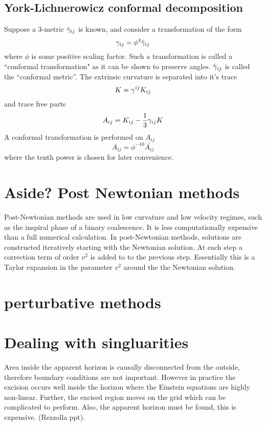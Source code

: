 \subsection{York-Lichnerowicz conformal decomposition}
Suppose a 3-metric $\bar{{\gamma}}_{ij}$ is known, and consider a transformation of the form
\[ {\gamma}_{ij}= \phi^4 \bar{{\gamma}}_{ij} \]
where $\phi$ is some positive scaling factor. Such a transformation is called a ``conformal transformation" as it can be shown to preserve angles. $\bar{{\gamma}}_{ij}$ is called the ``conformal metric''. The extrinsic curvature is separated into it's trace
\[ K={\gamma}^{ij} K_{ij} \]
and trace free parts
\[ A_{ij}=K_{ij} - \frac{1}{3} {\gamma}_{ij}K \]
A conformal transformation is performed on $A_{ij}$
\[ A_{ij}=\phi^{-10}\bar{A_{ij}}\]
where the tenth power is chosen for later convenience. 

\section{Aside? Post Newtonian methods}
Post-Newtonian methods are used in low curvature and low velocity regimes, such as the inspiral phase of a binary coalescence. It is less computationally expensive than a full numerical calculation. In post-Newtonian methods, solutions are constructed iteratively starting with the Newtonian solution. At each step a correction term of order $v^2$ is added to to the previous step. Essentially this is a Taylor expansion in the parameter $v^2$ around the the Newtonian solution. 

\section{perturbative methods}

\section{Dealing with singluarities}
Area inside the apparent horizon is causally disconnected from the outside, therefore boundary conditions are not important. However in practice the excision occurs well inside the horizon where the Einstein equations are highly non-linear. Further, the excised region moves on the grid which can be complicated to perform. Also, the apparent horizon must be found, this is expensive. (Rezzolla ppt).


